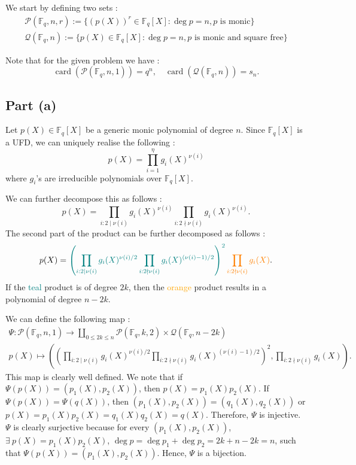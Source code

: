 We start by defining two sets : 
\begin{gather*}
    \mathcal{P}(\mathbb{F}_q, n,r) := \{(p(X))^r\in \mathbb{F}_q[X] : \deg{p}=n, \text{$p$ is monic}\} \\
    \mathcal{Q}(\mathbb{F}_q,n) := \{p(X) \in \mathbb{F}_q[X] : \deg{p}=n, \text{$p$ is monic and square free}\}
\end{gather*}

Note that for the given problem we have : 
\[\operatorname{card}(\mathcal{P}(\mathbb{F}_q, n,1))=q^n, \quad \operatorname{card}(\mathcal{Q}(\mathbb{F}_q,n)) = s_n.\]
\subsection{Part (a)}
Let $p(X)\in \mathbb{F}_q[X]$ be a generic monic polynomial of degree $n$. Since $\mathbb{F}_q[X]$ is a UFD, we can uniquely realise the following : 
\[p(X) = \displaystyle\prod_{i=1}^\eta g_{i}(X)^{\nu(i)}\]
where $g_i$'s are irreducible polynomials over $\mathbb{F}_q[X]$.

We can further decompose this as follows : 
\[p(X) = \displaystyle\prod_{i : 2\mid\nu(i)}g_i(X)^{\nu(i)}\displaystyle\prod_{i : 2\nmid\nu(i)}g_i(X)^{\nu(i)}.\]
The second part of the product can be further decomposed as follows : 
\[p(X) = \mathcolor{teal}{\left(\displaystyle\prod_{i : 2\mid\nu(i)}g_i(X)^{\nu(i)/2}\displaystyle\prod_{i : 2\nmid\nu(i)}g_i(X)^{(\nu(i)-1)/2}\right)^2}\mathcolor{orange}{\displaystyle\prod_{i : 2\nmid\nu(i)}g_i(X)}.\]
If the \textcolor{teal}{teal} product is of degree $2k$, then the \textcolor{orange}{orange} product results in a polynomial of degree $n-2k$.

We can define the following map : 
\begin{gather*}\Psi : \mathcal{P}(\mathbb{F}_q, n,1) \to \coprod_{0\leq 2k\leq n} \mathcal{P}(\mathbb{F}_q, k,2)\times \mathcal{Q}(\mathbb{F}_q, n-2k) \\
p(X) \mapsto \left(\left(\displaystyle\prod_{i : 2\mid\nu(i)}g_i(X)^{\nu(i)/2}\displaystyle\prod_{i : 2\nmid\nu(i)}g_i(X)^{(\nu(i)-1)/2}\right)^2,\displaystyle\prod_{i : 2\nmid\nu(i)}g_i(X)\right).
\end{gather*}
This map is clearly well defined. We note that if $\Psi(p(X)) = (p_1(X), p_2(X))$, then $p(X) = p_1(X)p_2(X)$. If $\Psi(p(X)) = \Psi(q(X))$, then $(p_1(X), p_2(X)) = (q_1(X), q_2(X))$ or $p(X) = p_1(X)p_2(X)=q_1(X)q_2(X) = q(X)$. Therefore, $\Psi$ is injective. $\Psi$ is clearly surjective because for every $(p_1(X), p_2(X))$, $\exists\ p(X) = p_1(X)p_2(X)$, $\deg{p}= \deg{p_1}+\deg{p_2} = 2k + n-2k = n$, such that $\Psi(p(X)) = (p_1(X), p_2(X))$. Hence, $\Psi$ is a bijection.


